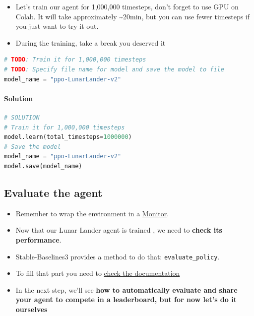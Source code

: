 \documentclass[11pt,a4paper]{article}
\begin{document}
\begin{itemize}
\tightlist
\item
  Let's train our agent for 1,000,000 timesteps, don't forget to use GPU on Colab. It will take approximately \textasciitilde20min, but you can use fewer timesteps if you just want to try it out.
\item
  During the training, take a break you deserved it
\end{itemize}

\begin{lstlisting}[language=Python]
# TODO: Train it for 1,000,000 timesteps
# TODO: Specify file name for model and save the model to file
model_name = "ppo-LunarLander-v2"
\end{lstlisting}

\paragraph{Solution}\label{solution-1}

\begin{lstlisting}[language=Python]
# SOLUTION
# Train it for 1,000,000 timesteps
model.learn(total_timesteps=1000000)
# Save the model
model_name = "ppo-LunarLander-v2"
model.save(model_name)
\end{lstlisting}

\subsection{Evaluate the agent}\label{evaluate-the-agent}

\begin{itemize}
\tightlist
\item
  Remember to wrap the environment in a \href{https://stable-baselines3.readthedocs.io/en/master/common/monitor.html}{Monitor}.
\item
  Now that our Lunar Lander agent is trained , we need to \textbf{check its performance}.
\item
  Stable-Baselines3 provides a method to do that: \passthrough{\lstinline!evaluate_policy!}.
\item
  To fill that part you need to \href{https://stable-baselines3.readthedocs.io/en/master/guide/examples.html\#basic-usage-training-saving-loading}{check the documentation}
\item
  In the next step, we'll see \textbf{how to automatically evaluate and share your agent to compete in a leaderboard, but for now let's do it ourselves}
\end{itemize}
\end{document}
